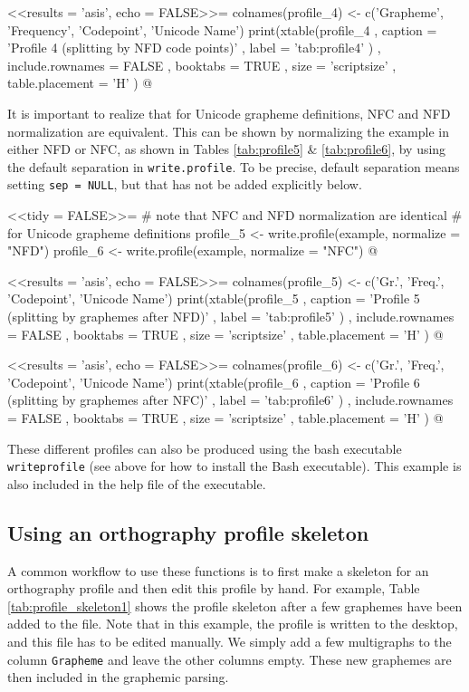 <<results = 'asis', echo = FALSE>>=
colnames(profile_4) <- c('Grapheme', 'Frequency', 'Codepoint', 'Unicode Name')
print(xtable(profile_4
        , caption = 'Profile 4 (splitting by NFD code points)'
        , label = 'tab:profile4'
        )
  , include.rownames = FALSE
  , booktabs = TRUE
  , size = 'scriptsize'
  , table.placement = 'H'
  )
@

It is important to realize that for Unicode grapheme definitions, NFC
and NFD normalization are equivalent. This can be shown by normalizing the
example in either NFD or NFC, as shown in Tables \ref{tab:profile5} \& \ref{tab:profile6}, 
by using the default separation in
\texttt{write.profile}. To be precise, default separation means setting
\texttt{sep~=~NULL}, but that has not be added explicitly below.

<<tidy = FALSE>>=
# note that NFC and NFD normalization are identical
# for Unicode grapheme definitions
profile_5 <- write.profile(example, normalize = "NFD")
profile_6 <- write.profile(example, normalize = "NFC")
@

<<results = 'asis', echo = FALSE>>=
colnames(profile_5) <- c('Gr.', 'Freq.', 'Codepoint', 'Unicode Name')
print(xtable(profile_5
        , caption = 'Profile 5 (splitting by graphemes after NFD)'
        , label = 'tab:profile5'
        )
  , include.rownames = FALSE
  , booktabs = TRUE
  , size = 'scriptsize'
  , table.placement = 'H'
  )
@

<<results = 'asis', echo = FALSE>>=
colnames(profile_6) <- c('Gr.', 'Freq.', 'Codepoint', 'Unicode Name')
print(xtable(profile_6
        , caption = 'Profile 6 (splitting by graphemes after NFC)'
        , label = 'tab:profile6'
        )
  , include.rownames = FALSE
  , booktabs = TRUE
  , size = 'scriptsize'
  , table.placement = 'H'
  )
@

These different profiles can also be produced using the bash
executable \texttt{writeprofile} (see above for how to install the Bash executable). 
This example is also included in the help file of the executable.



\subsection*{Using an orthography profile skeleton}
\label{profile-skeleton}

A common workflow to use these functions is to first make a skeleton for an
orthography profile and then edit this profile by hand. For example, Table
\ref{tab:profile_skeleton1} shows the profile skeleton after a few graphemes have
been added to the file. Note that in this example, the profile is written to the
desktop, and this file has to be edited manually. We simply add a few
multigraphs to the column \texttt{Grapheme} and leave the other columns empty.
These new graphemes are then included in the graphemic parsing.

